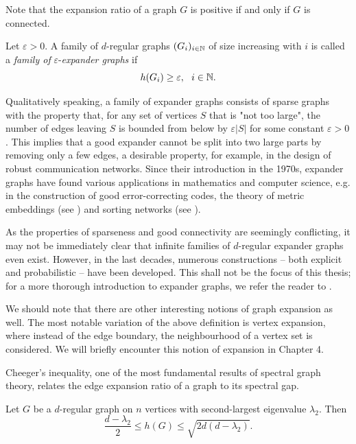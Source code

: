 Note that the expansion ratio of a graph $G$ is positive if and only if $G$ is connected. 

\begin{definition}
    Let $\varepsilon > 0$. A family of $d$-regular graphs $(G_i)_{i \in \mathbb{N}}$ of size increasing with $i$ is called a \textit{family of} $\varepsilon$-\textit{expander graphs} if
    \begin{equation*}
        h(G_i) \ge \varepsilon, \ \ i \in \N.
    \end{equation*}
\end{definition}

Qualitatively speaking, a family of expander graphs consists of sparse graphs with the property that, for any set of vertices $S$ that is "not too large", the number of edges leaving $S$ is bounded from below by $\varepsilon |S|$ for some constant $\varepsilon > 0$. 
This implies that a good expander cannot be split into two large parts by removing only a few edges, a desirable property, for example, in the design of robust communication networks. 
Since their introduction in the 1970s, expander graphs have found various applications in mathematics and computer science, e.g. in the construction of good error-correcting codes, the theory of metric embeddings (see \cite{expandergraphs}) and sorting networks (see \cite{aks}).

As the properties of sparseness and good connectivity are seemingly conflicting, it may not be immediately clear that infinite families of $d$-regular expander graphs even exist.
However, in the last decades, numerous constructions – both explicit and probabilistic – have been developed.
This shall not be the focus of this thesis; for a more thorough introduction to expander graphs, we refer the reader to \cite{expandergraphs}.

We should note that there are other interesting notions of graph expansion as well.
The most notable variation of the above definition is vertex expansion, where instead of the edge boundary, the neighbourhood of a vertex set is considered.
We will briefly encounter this notion of expansion in Chapter 4.

Cheeger's inequality, one of the most fundamental results of spectral graph theory, relates the edge expansion ratio of a graph to its spectral gap. 

\begin{theorem} \label{thm:cheeger}
    Let $G$ be a $d$-regular graph on $n$ vertices with second-largest eigenvalue $\lambda_2$. Then 
    \begin{equation*}
        \frac{d - \lambda_2}{2} \le h(G) \le \sqrt{2d (d - \lambda_2)}.
    \end{equation*}
\end{theorem}

